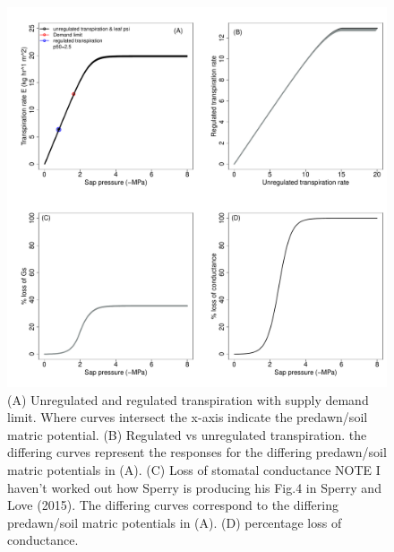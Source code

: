 \documentclass[a4paper]{article}\usepackage[]{graphicx}\usepackage[]{color}
\makeatletter
\def\maxwidth{ %
  \ifdim\Gin@nat@width>\linewidth
    \linewidth
  \else
    \Gin@nat@width
  \fi
}
\newenvironment{knitrout}{}{} %
\makeatother
\begin{document}
\begin{centering}
\begin{knitrout}
\color{fgcolor}\begin{figure}
\includegraphics[width=\maxwidth]{figure/unnamed-chunk-10-1} \caption{\label{fig:figs}(A) Unregulated and regulated transpiration with supply demand limit. Where curves intersect the x-axis indicate the predawn/soil matric potential. (B) Regulated vs unregulated transpiration. the differing curves represent the responses for the differing predawn/soil matric potentials in (A). (C) Loss of stomatal conductance NOTE I haven't worked out how Sperry is producing his Fig.4 in Sperry and Love (2015). The differing curves correspond to the differing predawn/soil matric potentials in (A). (D) percentage loss of conductance.}\label{fig:unnamed-chunk-10}
\end{figure}


\end{knitrout}
\end{centering}

\end{document}
